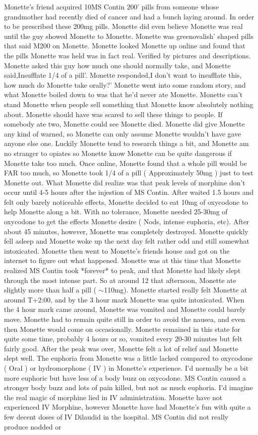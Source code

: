 \documentclass[12pt]{book}
\begin{document}
Monette's friend acquired 10MS Contin 200' pills from someone whose grandmother had recently died of cancer and had a bunch laying around. In order to be prescribed these 200mg pills. Monette did even believe Monette was real until the guy showed Monette to Monette. Monette was greenovalish' shaped pills that said M200 on Monette. Monette looked Monette up online and found that the pills Monette was held was in fact real. Verified by pictures and descriptions. Monette asked this guy how much one should normally take, and Monette said,Insufflate 1/4 of a pill'. Monette responded,I don't want to insufflate this, how much do Monette take orally?' Monette went into some random story, and what Monette boiled down to was that he'd never ate Monette. Monette can't stand Monette when people sell something that Monette know absolutely nothing about. Monette should have was scared to sell these things to people. If somebody ate two, Monette could see Monette died. Monette did give Monette any kind of warned, so Monette can only assume Monette wouldn't have gave anyone else one. Luckily Monette tend to research things a bit, and Monette am no stranger to opiates so Monette know Monette can be quite dangerous if Monette take too much. Once online, Monette found that a whole pill would be FAR too much, so Monette took 1/4 of a pill ( Approximately 50mg ) just to test Monette out. What Monette did realize was that peak levels of morphine don't occur until 4-5 hours after the injestion of MS Contin. After waited 1.5 hours and felt only barely noticeable effects, Monette decided to eat 10mg of oxycodone to help Monette along a bit. With no tolerance, Monette needed 25-30mg of oxycodone to get the effects Monette desire ( Nods, intense euphoria, etc). After about 45 minutes, however, Monette was completely destroyed. Monette quickly fell asleep and Monette woke up the next day felt rather odd and still somewhat intoxicated. Monette then went to Monette's friends house and got on the internet to figure out what happened. Monette was at this time that Monette realized MS Contin took *forever* to peak, and that Monette had likely slept through the most intense part. So at around 12 that afternoon, Monette ate slightly more than half a pill ( $\sim$110mg). Monette started really felt Monette at around T+2:00, and by the 3 hour mark Monette was quite intoxicated. When the 4 hour mark came around, Monette was vomited and Monette could barely move. Monette had to remain quite still in order to avoid the nausea, and even then Monette would come on occasionally. Monette remained in this state for quite some time, probably 4 hours or so, vomited every 20-30 minutes but felt fairly good. After the peak was over, Monette felt a lot of relief and Monette slept well. The euphoria from Monette was a little lacked compared to oxycodone ( Oral ) or hydromorphone ( IV ) in Monette's experience. I'd normally be a bit more euphoric but have less of a body buzz on oxycodone. MS Contin caused a stronger body buzz and lots of pain killed, but not as much euphoria. I'd imagine the real magic of morphine lied in IV administration. Monette have not experienced IV Morphine, however Monette have had Monette's fun with quite a few decent doses of IV Dilaudid in the hospital. MS Contin did not really produce nodded or 
\end{document}
